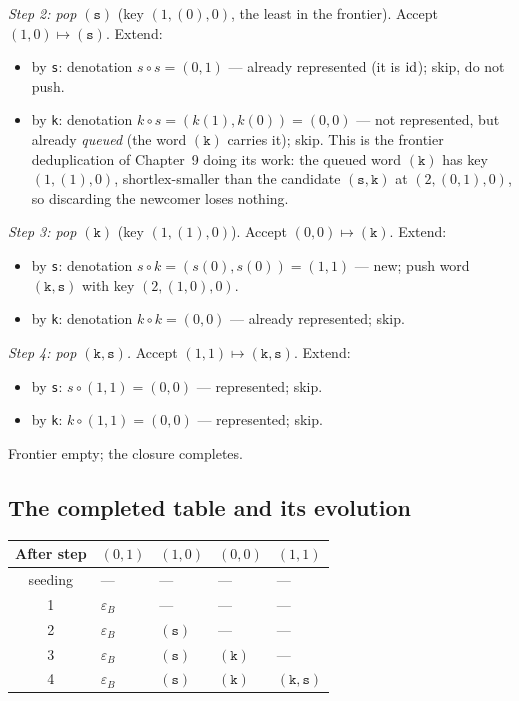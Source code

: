 \emph{Step 2: pop $(\texttt{s})$} (key $(1,(0),0)$, the least in the
frontier). Accept $(1,0) \mapsto (\texttt{s})$. Extend:
\begin{itemize}
\item by \texttt{s}: denotation $s \circ s = (0,1)$ --- already
      represented (it is $\mathrm{id}$); skip, do not push.
\item by \texttt{k}: denotation $k \circ s = (k(1), k(0)) = (0,0)$
      --- not represented, but already \emph{queued} (the word
      $(\texttt{k})$ carries it); skip. This is the frontier
      deduplication of Chapter~9 doing its work: the queued word
      $(\texttt{k})$ has key $(1,(1),0)$, shortlex-smaller than the
      candidate $(\texttt{s},\texttt{k})$ at $(2,(0,1),0)$, so
      discarding the newcomer loses nothing.
\end{itemize}

\emph{Step 3: pop $(\texttt{k})$} (key $(1,(1),0)$). Accept
$(0,0) \mapsto (\texttt{k})$. Extend:
\begin{itemize}
\item by \texttt{s}: denotation $s \circ k = (s(0), s(0)) = (1,1)$
      --- new; push word $(\texttt{k}, \texttt{s})$ with key
      $(2, (1,0), 0)$.
\item by \texttt{k}: denotation $k \circ k = (0,0)$ --- already
      represented; skip.
\end{itemize}

\emph{Step 4: pop $(\texttt{k}, \texttt{s})$.} Accept
$(1,1) \mapsto (\texttt{k}, \texttt{s})$. Extend:
\begin{itemize}
\item by \texttt{s}: $s \circ (1,1) = (0,0)$ --- represented; skip.
\item by \texttt{k}: $k \circ (1,1) = (0,0)$ --- represented; skip.
\end{itemize}
Frontier empty; the closure completes.

\subsection{The completed table and its evolution}

\begin{center}
\begin{tabular}{@{}cllll@{}}
\toprule
After step & $(0,1)$ & $(1,0)$ & $(0,0)$ & $(1,1)$ \\
\midrule
seeding & --- & --- & --- & --- \\
1 & $\varepsilon_B$ & --- & --- & --- \\
2 & $\varepsilon_B$ & $(\texttt{s})$ & --- & --- \\
3 & $\varepsilon_B$ & $(\texttt{s})$ & $(\texttt{k})$ & --- \\
4 & $\varepsilon_B$ & $(\texttt{s})$ & $(\texttt{k})$ & $(\texttt{k},\texttt{s})$ \\
\bottomrule
\end{tabular}
\end{center}

